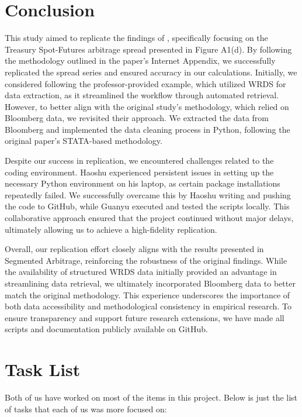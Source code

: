 \documentclass{article}
\begin{document}
\section{Conclusion}
This study aimed to replicate the findings of \cite{siriwardane2023segmented}, specifically focusing on the Treasury Spot-Futures arbitrage spread presented in Figure A1(d). By following the methodology outlined in the paper’s Internet Appendix, we successfully replicated the spread series and ensured accuracy in our calculations. Initially, we considered following the professor-provided example, which utilized WRDS for data extraction, as it streamlined the workflow through automated retrieval. However, to better align with the original study’s methodology, which relied on Bloomberg data, we revisited their approach. We extracted the data from Bloomberg and implemented the data cleaning process in Python, following the original paper’s STATA-based methodology.

Despite our success in replication, we encountered challenges related to the coding environment. Haoshu experienced persistent issues in setting up the necessary Python environment on his laptop, as certain package installations repeatedly failed. We successfully overcame this by Haoshu writing and pushing the code to GitHub, while Guanyu executed and tested the scripts locally. This collaborative approach ensured that the project continued without major delays, ultimately allowing us to achieve a high-fidelity replication.

Overall, our replication effort closely aligns with the results presented in Segmented Arbitrage, reinforcing the robustness of the original findings. While the availability of structured WRDS data initially provided an advantage in streamlining data retrieval, we ultimately incorporated Bloomberg data to better match the original methodology. This experience underscores the importance of both data accessibility and methodological consistency in empirical research. To ensure transparency and support future research extensions, we have made all scripts and documentation publicly available on GitHub.

\section{Task List}

Both of us have worked on most of the items in this project. Below is just the list of tasks that each of us was more focused on:
\end{document}
